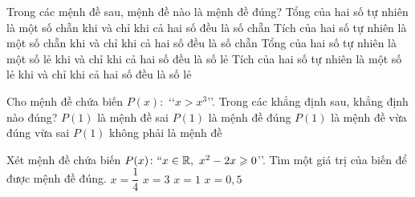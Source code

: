 \begin{ex}%
	Trong các mệnh đề sau, mệnh đề nào là mệnh đề đúng?
	\choice
	{Tổng của hai số tự nhiên là một số chẵn khi và chỉ khi cả hai số đều là số chẵn}
	{Tích của hai số tự nhiên là một số chẵn khi và chỉ khi cả hai số đều là số chẵn}
	{Tổng của hai số tự nhiên là một số lẻ khi và chỉ khi cả hai số đều là số lẻ}
	{\True Tích của hai số tự nhiên là một số lẻ khi và chỉ khi cả hai số đều là số lẻ}
\end{ex}
\begin{ex}%
	Cho mệnh đề chứa biến $P(x)\colon$ \lq\lq $x>x^3$\rq\rq. Trong các khẳng định sau, khẳng định nào đúng?
	\choice
	{\True $P(1)$ là mệnh đề sai}
	{$P(1)$ là mệnh đề đúng}
	{$P(1)$ là mệnh đề vừa đúng vừa sai}
	{$P(1)$ không phải là mệnh đề}
\end{ex}
\begin{ex}%
	Xét mệnh đề chứa biến $P(x)\colon\lq\lq  x\in\mathbb{R},\ x^2-2x\geqslant 0$\rq\rq. Tìm một giá trị của biến để được mệnh đề đúng.
	\choice
	{$ x=\dfrac{1}{4}$}
	{\True $ x=3$}
	{$ x=1$}
	{$ x=0{,}5$}
\end{ex}

